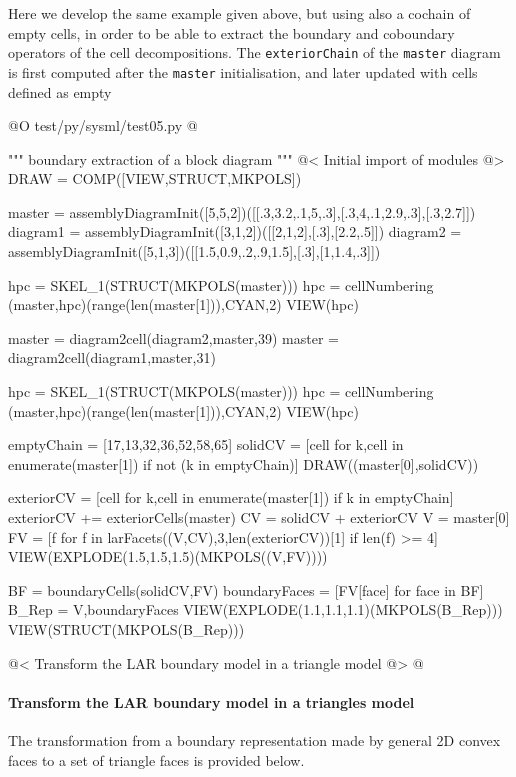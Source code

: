 \documentclass[11pt,oneside]{article}	%
\begin{document}
Here we develop the same example \texttt{} given above, but using also a cochain of empty cells,
in order to be able to extract the boundary and coboundary operators of the cell decompositions. 
The \texttt{exteriorChain}
of the \texttt{master} diagram is first computed after the \texttt{master} initialisation, and later updated with cells defined as empty

@O test/py/sysml/test05.py
@{""" boundary extraction of a block diagram """
@< Initial import of modules @>
DRAW = COMP([VIEW,STRUCT,MKPOLS])

master = assemblyDiagramInit([5,5,2])([[.3,3.2,.1,5,.3],[.3,4,.1,2.9,.3],[.3,2.7]])
diagram1 = assemblyDiagramInit([3,1,2])([[2,1,2],[.3],[2.2,.5]])
diagram2 = assemblyDiagramInit([5,1,3])([[1.5,0.9,.2,.9,1.5],[.3],[1,1.4,.3]])

hpc = SKEL_1(STRUCT(MKPOLS(master)))
hpc = cellNumbering (master,hpc)(range(len(master[1])),CYAN,2)
VIEW(hpc)
 
master = diagram2cell(diagram2,master,39)
master = diagram2cell(diagram1,master,31)

hpc = SKEL_1(STRUCT(MKPOLS(master)))
hpc = cellNumbering (master,hpc)(range(len(master[1])),CYAN,2)
VIEW(hpc)

emptyChain = [17,13,32,36,52,58,65]
solidCV = [cell for k,cell in enumerate(master[1]) if not (k in emptyChain)]
DRAW((master[0],solidCV))

exteriorCV =  [cell for k,cell in enumerate(master[1]) if k in emptyChain]
exteriorCV += exteriorCells(master)
CV = solidCV + exteriorCV
V = master[0]
FV = [f for f in larFacets((V,CV),3,len(exteriorCV))[1] if len(f) >= 4]
VIEW(EXPLODE(1.5,1.5,1.5)(MKPOLS((V,FV))))

BF = boundaryCells(solidCV,FV)
boundaryFaces = [FV[face] for face in BF]
B_Rep = V,boundaryFaces
VIEW(EXPLODE(1.1,1.1,1.1)(MKPOLS(B_Rep)))
VIEW(STRUCT(MKPOLS(B_Rep)))

@< Transform the LAR boundary model in a triangle model @>
@}

\paragraph{Transform the LAR boundary model in a triangles model}
The transformation from a boundary representation made by general 2D convex faces to a set of triangle faces is provided below.
\end{document}
